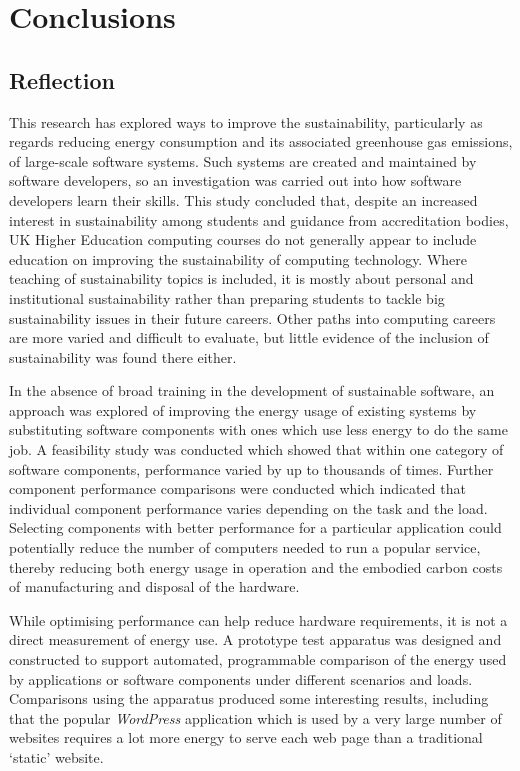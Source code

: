 \chapter{Conclusions}
\label{chapter:conclusions}

\section{Reflection}

This research has explored ways to improve the sustainability, particularly as regards reducing energy consumption and its associated greenhouse gas emissions, of large-scale software systems. Such systems are created and maintained by software developers, so an investigation was carried out into how software developers learn their skills. This study concluded that, despite an increased interest in sustainability among students and guidance from accreditation bodies, UK Higher Education computing courses do not generally appear to include education on improving the sustainability of computing technology. Where teaching of sustainability topics is included, it is mostly about personal and institutional sustainability rather than preparing students to tackle big sustainability issues in their future careers. Other paths into computing careers are more varied and difficult to evaluate, but little evidence of the inclusion of sustainability was found there either.

In the absence of broad training in the development of sustainable software, an approach was explored of improving the energy usage of existing systems by substituting software components with ones which use less energy to do the same job. A feasibility study was conducted which showed that within one category of software components, performance varied by up to thousands of times. Further component performance comparisons were conducted which indicated that individual component performance varies depending on the task and the load. Selecting components with better performance for a particular application could potentially reduce the number of computers needed to run a popular service, thereby reducing both energy usage in operation and the embodied carbon costs of manufacturing and disposal of the hardware.

While optimising performance can help reduce hardware requirements, it is not a direct measurement of energy use. A prototype test apparatus was designed and constructed to support automated, programmable comparison of the energy used by applications or software components under different scenarios and loads. Comparisons using the apparatus produced some interesting results, including that the popular \emph{WordPress} application which is used by a very large number of websites requires a lot more energy to serve each web page than a traditional `static' website.

